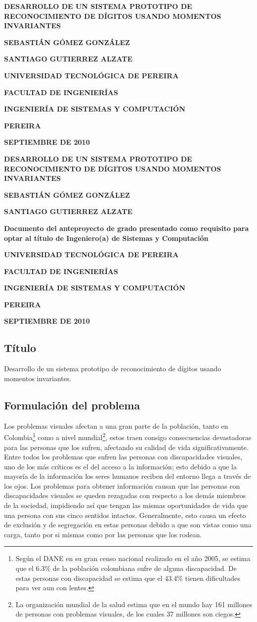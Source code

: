 \documentclass[a4paper, 11pt, oneside]{article}
\newcommand\portada{
	\begin{titlepage}
		\begin{center}
			{\large \bf DESARROLLO DE UN SISTEMA PROTOTIPO DE RECONOCIMIENTO DE DÍGITOS USANDO MOMENTOS INVARIANTES }
			\vfill
			{\large\bf SEBASTIÁN GÓMEZ GONZÁLEZ \par}
			{\large\bf SANTIAGO GUTIERREZ ALZATE \par}
			\vfill
			{\large\bf UNIVERSIDAD TECNOLÓGICA DE PEREIRA  \par}
			{\large\bf FACULTAD DE INGENIERÍAS \par}
			{\large\bf INGENIERÍA DE SISTEMAS Y COMPUTACIÓN \par}
			{\large\bf PEREIRA\par}
			{\large\bf SEPTIEMBRE DE 2010 \par}
		\end{center}
	\end{titlepage}
}
\newcommand\contraportada{
	\begin{titlepage}
		\begin{center}
			{\large \bf DESARROLLO DE UN SISTEMA PROTOTIPO DE RECONOCIMIENTO DE DÍGITOS USANDO MOMENTOS INVARIANTES }
			\vfill
			{\large\bf SEBASTIÁN GÓMEZ GONZÁLEZ \par}
			{\large\bf SANTIAGO GUTIERREZ ALZATE \par}
			\vfill
			{\large\bf Documento del anteproyecto de grado presentado como requisito para optar al título de Ingeniero(a) de Sistemas y Computación\par}
			\vfill
			{\large\bf UNIVERSIDAD TECNOLÓGICA DE PEREIRA  \par}
			{\large\bf FACULTAD DE INGENIERÍAS \par}
			{\large\bf INGENIERÍA DE SISTEMAS Y COMPUTACIÓN \par}
			{\large\bf PEREIRA\par}
			{\large\bf SEPTIEMBRE DE 2010 \par}
		\end{center}
	\end{titlepage}
}
\begin{document}
\portada
\contraportada

	\tableofcontents

	\clearpage
	\begin{center}
	\section{Título}
	\end{center}
	Desarrollo de un sistema prototipo de reconocimiento de dígitos usando momentos invariantes.
	\clearpage
	
	\begin{center}
	\section{Formulación del problema}
	\end{center}

	Los problemas visuales afectan a una gran parte de la población, tanto en Colombia\footnote{Según el DANE en su gran censo nacional realizado en el año 2005, se estima que el 6.3\% de la población colombiana sufre de alguna discapacidad. De estas personas con discapacidad se estima que el 43.4\% tienen dificultades para ver aun con lentes.} como a nivel mundial\footnote{La organización mundial de la salud estima que en el mundo hay 161 millones de personas con problemas visuales, de los cuales 37 millones son ciegos.}, estos traen consigo consecuencias devastadoras para las personas que los sufren, afectando su calidad de vida significativamente. Entre todos los problemas que sufren las personas con discapacidades visuales, uno de los más críticos es el del acceso a la información; esto debido a que la mayoría de la información los seres humanos reciben del entorno llega a través de los ojos. Los problemas para obtener información causan que las personas con discapacidades visuales se queden rezagadas con respecto a los demás miembros de la sociedad, impidiendo así que tengan las mismas oportunidades de vida que una persona con sus cinco sentidos intactos. Generalmente, esto causa un efecto de exclusión y de segregación en estas personas debido a que son vistas como una carga, tanto por si mismas como por las personas que los rodean. 
\end{document}
